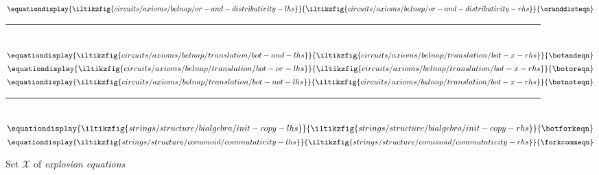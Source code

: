 \begin{figure*}
{    }{
        \andorddisteqn
    }\)
    \,\,
    \(\equationdisplay{
        \iltikzfig{circuits/axioms/belnap/or-and-distributivity-lhs}
    }{
        \iltikzfig{circuits/axioms/belnap/or-and-distributivity-rhs}
    }{
        \oranddisteqn
    }\)
    \\[0.2em]
    \rule{\textwidth}{0.1mm}
    \\[0.3em]
    \(\equationdisplay{
        \iltikzfig{circuits/axioms/belnap/translation/bot-and-lhs}
    }{
        \iltikzfig{circuits/axioms/belnap/translation/bot-x-rhs}
    }{
        \botandeqn
    }\)
    \quad
    \(\equationdisplay{
        \iltikzfig{circuits/axioms/belnap/translation/bot-or-lhs}
    }{
        \iltikzfig{circuits/axioms/belnap/translation/bot-x-rhs}
    }{
        \botoreqn
    }\)
    \quad
    \(\equationdisplay{
        \iltikzfig{circuits/axioms/belnap/translation/bot-not-lhs}
    }{
        \iltikzfig{circuits/axioms/belnap/translation/bot-x-rhs}
    }{
        \botnoteqn
    }\)
    \\[0.2em]
    \rule{\textwidth}{0.1mm}
    \\[0.3em]
    \(\equationdisplay{
        \iltikzfig{strings/structure/bialgebra/init-copy-lhs}
    }{
        \iltikzfig{strings/structure/bialgebra/init-copy-rhs}
    }{
        \botforkeqn
    }\)
    \quad
    \(\equationdisplay{
        \iltikzfig{strings/structure/comonoid/commutativity-lhs}
    }{
        \iltikzfig{strings/structure/comonoid/commutativity-rhs}
    }{
        \forkcommeqn
    }\)
    \caption{Set \(\mathcal{X}\) of \emph{explosion equations}}
    \label{fig:explosion-equations}
\end{figure*}
